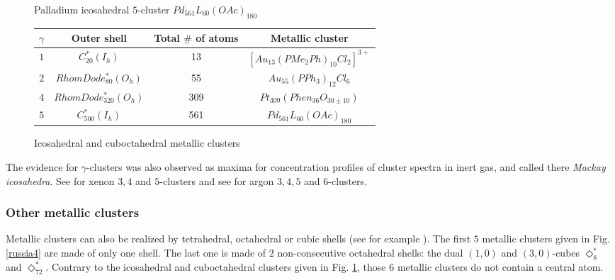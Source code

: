 \begin{figure}[htbp]
\begin{center}
\caption{Palladium icosahedral $5$-cluster $Pd_{561} L_{60}(OAc)_{180}$}\label{russia}
\end{center}

\vspace{3mm}
\begin{center}
\begin{tabular}{|c|c|c|c|} \hline
$\gamma$ & Outer shell & Total $\#$ of atoms & Metallic cluster \\ \hline \hline
$1$ & $C^*_{20}(I_h)$  &  13  & $[Au_{13}(PMe_2Ph)_{10}Cl_2]^{3+}$ \\  \hline
$2$ & $RhomDode^*_{80}(O_h)$  &  55  & $Au_{55}(PPh_3)_{12}Cl_6$ \\  \hline
$4$ & $RhomDode^*_{320}(O_h)$ & 309 & $Pt_{309}(Phen_{36}O_{30\pm 10})$ \\ \hline
$5$ & $C^*_{500}(I_h)$ & 561 & $Pd_{561} L_{60}(OAc)_{180}$ \\  \hline
\end{tabular}
\caption{Icosahedral and cuboctahedral metallic clusters}\label{russia2}
\end{center}
\end{figure}

The evidence for $\gamma$-clusters was also observed as maxima for concentration
profiles of cluster spectra in inert gas, and called there {\it Mackay icosahedra}.
See \cite{esr81} for xenon $3,4$ and $5$-clusters and see \cite{fb83} for
argon $3,4,5$ and $6$-clusters.

\newpage
\subsubsection{Other metallic clusters}
Metallic clusters can also be realized by tetrahedral, octahedral or cubic shells
(see for example \cite{ts85}). The first $5$ metallic clusters given in Fig. \ref{russia4}
are made of only one shell. The last one is made of $2$ non-consecutive octahedral
shells: the dual $(1,0)$ and $(3,0)$-cubes $\Diamond^*_{8}$ and $\Diamond^*_{72}$.
Contrary to the icosahedral and cuboctahedral clusters given in
Fig. \ref{russia2}, those $6$ metallic clusters do not contain a central atom.

